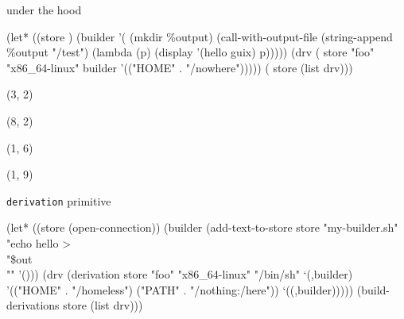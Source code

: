\documentclass{beamer}
\begin{document}
\begin{frame}[fragile]{under the hood}
  \begin{semiverbatim}
(let* ((store   )
       (builder '(
                   (mkdir \%output)
                   (call-with-output-file
                       (string-append \%output "/test")
                     (lambda (p)
                       (display '(hello guix) p)))))
       (drv (
               store "foo" "x86\_64-linux"
               builder
               '(("HOME" . "/nowhere")))))
  ( store (list drv)))
  \end{semiverbatim}

  \begin{textblock}{6}(3, 2)
  \end{textblock}

  \begin{textblock}{6}(8, 2)
  \end{textblock}

  \begin{textblock}{4}(1, 6)
  \end{textblock}

  \begin{textblock}{6}(1, 9)
  \end{textblock}

\end{frame}

\begin{frame}[fragile]{\texttt{derivation} primitive}
  \begin{semiverbatim}
  (let* ((store (open-connection))
         (builder
          (add-text-to-store store "my-builder.sh"
                             "echo hello > \\"\$out\\""
                             '()))
         (drv
          (\alert{derivation} store "foo" "x86\_64-linux"
                      "/bin/sh" `(,builder)
                      '(("HOME" . "/homeless")
                        ("PATH" . "/nothing:/here"))
                      `((,builder)))))
    (build-derivations store (list drv)))
  \end{semiverbatim}
\end{frame}
\end{document}
